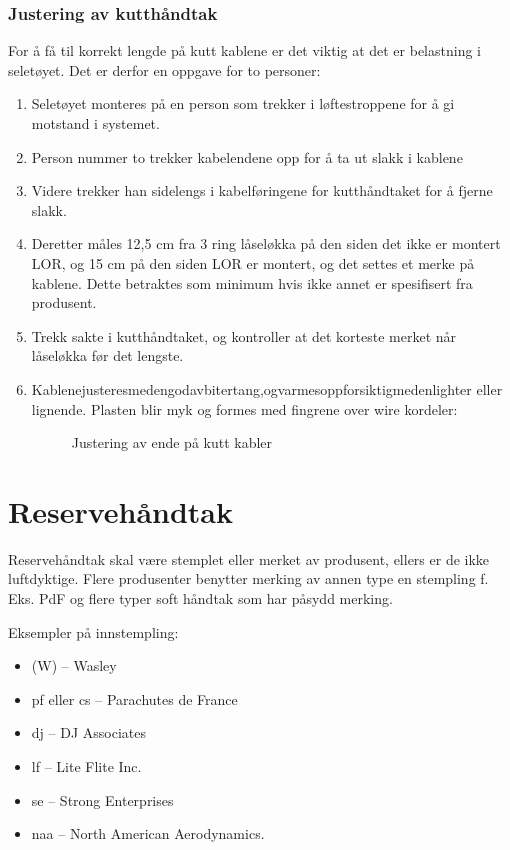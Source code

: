 \subsubsection{Justering av kutthåndtak}
For å få til korrekt lengde på kutt kablene er det viktig at det er belastning i seletøyet. Det er derfor en oppgave for to personer:
\begin{enumerate}
\item Seletøyet monteres på en person som trekker i løftestroppene for å gi motstand i systemet.
\item Person nummer to trekker kabelendene opp for å ta ut slakk i kablene
\item Videre trekker han sidelengs i kabelføringene for kutthåndtaket for å fjerne slakk.
\item Deretter måles 12,5 cm fra 3 ring låseløkka på den siden det ikke er montert LOR, og 15 cm på den siden LOR er montert, og det settes et merke på kablene. Dette betraktes som minimum hvis ikke annet er spesifisert fra produsent.
\item Trekk sakte i kutthåndtaket, og kontroller at det korteste merket når låseløkka før det lengste.
\item Kablenejusteresmedengodavbitertang,ogvarmesoppforsiktigmedenlighter eller lignende. Plasten blir myk og formes med fingrene over wire kordeler:
\begin{figure}
	\caption{Justering av ende på kutt kabler}
\end{figure}

\end{enumerate}

\section{Reservehåndtak}
Reservehåndtak skal være stemplet eller merket av produsent, ellers er de ikke luftdyktige. Flere produsenter benytter merking av annen type en stempling f. Eks. PdF og flere typer soft håndtak som har påsydd merking.

Eksempler på innstempling:
\begin{itemize}
\item (W) – Wasley
\item pf eller cs – Parachutes de France
\item dj – DJ Associates
\item lf – Lite Flite Inc.
\item se – Strong Enterprises
\item naa – North American Aerodynamics.
\end{itemize}


